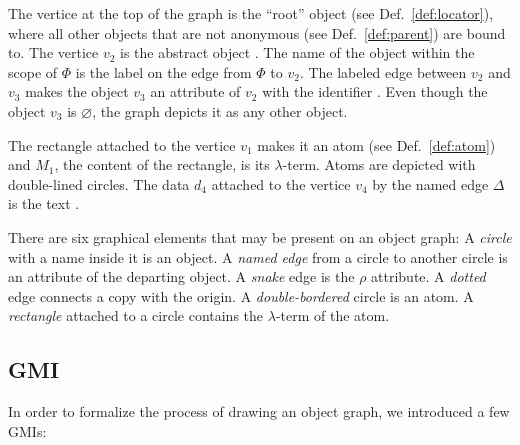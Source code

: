 The vertice at the top of the graph is the ``root'' object (see Def.~\ref{def:locator}),
where all other objects that are not anonymous (see Def.~\ref{def:parent}) are bound to.
The vertice $v_2$ is the abstract object . The name of the object within the
scope of $\Phi$ is the label on the edge from $\Phi$ to $v_2$. The labeled edge
between $v_2$ and $v_3$ makes the object $v_3$ an attribute of $v_2$ with the
identifier . Even though the object $v_3$ is $\varnothing$, the graph
depicts it as any other object.

The rectangle attached to the vertice $v_1$ makes it an atom (see Def.~\ref{def:atom})
and $M_1$, the content of the rectangle, is its $\lambda$-term. Atoms
are depicted with double-lined circles. The data $d_4$
attached to the vertice $v_4$ by the named edge $\Delta$
is the text .

There are six graphical elements that may be present on an object graph:
A \emph{circle} with a name inside it is an object.
A \emph{named edge} from a circle to another circle is an attribute of the departing object.
A \emph{snake} edge is the $\rho$ attribute.
A \emph{dotted} edge connects a copy with the origin.
A \emph{double-bordered} circle is an atom.
A \emph{rectangle} attached to a circle contains the $\lambda$-term of the atom.

\subsection{GMI}

In order to formalize the process of drawing an object graph,
we introduced a few GMIs:


